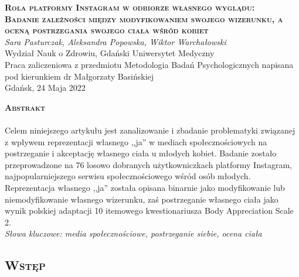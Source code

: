 \documentclass[12pt,a4paper,final,oneside,onecolumn,titlepage]{article}
\begin{document}
\pagestyle{fancy}
\fancyhead{}
\fancyfoot{}
\rhead{\thepage}

\begin{titlepage}
  \thispagestyle{empty}
  \begin{center}
  \vspace*{1cm}
  \Large
  \textbf{\textsc{Rola platformy Instagram w odbiorze własnego wyglądu:\\ Badanie zależności między modyfikowaniem swojego wizerunku, a oceną postrzegania swojego ciała wśród kobiet\\}}
  \vspace{1.5cm}
  \textit{Sara Pasturczak, Aleksandra Popowska, Wiktor Warchałowski\\}
  Wydział Nauk o Zdrowiu, Gdański Uniwersytet Medyczny\\
  \vspace{3cm}
  Praca zaliczeniowa z przedmiotu Metodologia Badań Psychologicznych napisana pod kierunkiem dr Małgorzaty Basińskiej\\
  \vspace{3cm}
  Gdańsk, 24 Maja 2022
  \end{center}
\end{titlepage}
\begin{center}
  \vspace*{0.5cm}
  \large{\textbf{\textsc{Abstrakt}}}
\end{center}
\paragraph{}
Celem niniejszego artykułu jest zanalizowanie i zbadanie problematyki związanej z wpływem reprezentacji własnego ,,ja'' w mediach społecznościowych na postrzeganie i akceptację własnego ciała u młodych kobiet. Badanie zostało przeprowadzone na 76 losowo dobranych użytkowniczkach platformy Instagram, najpopularniejszego serwisu społecznościowego wśród osób młodych. Reprezentacja własnego ,,ja'' została opisana binarnie jako modyfikowanie lub niemodyfikowanie własnego wizerunku, zaś postrzeganie własnego ciała jako wynik polskiej adaptacji 10 itemowego kwestionariusza Body Appreciation Scale 2.\\
\textit{Słowa kluczowe: media społecznościowe, postrzeganie siebie, ocena ciała}
\newpage
\begin{center}
\section*{\large{\textbf{\textsc{Wstęp}}}}
\end{center}
\end{document}
